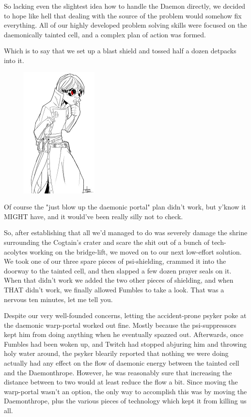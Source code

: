 So lacking even the slightest idea how to handle the Daemon directly, we decided to hope like hell that dealing with the source of the problem would somehow fix everything. 
All of our highly developed problem solving skills were focused on the daemonically tainted cell, and a complex plan of action was formed. 


Which is to say that we set up a blast shield and tossed half a dozen detpacks into it.

\begin{figure}
	\begin{center}
		\includegraphics[width=\figwidth]{pics/15/42.png}
	\end{center}
\end{figure}
Of course the "just blow up the daemonic portal" plan didn't work, but y'know it MIGHT have, and it would've been really silly not to check. 


So, after establishing that all we'd managed to do was severely damage the shrine surrounding the Cogtain's crater and scare the shit out of a bunch of tech-acolytes working on the bridge-lift, we moved on to our next low-effort solution. 
We took one of our three spare pieces of psi-shielding, crammed it into the doorway to the tainted cell, and then slapped a few dozen prayer seals on it. 
When that didn't work we added the two other pieces of shielding, and when THAT didn't work, we finally allowed Fumbles to take a look. 
That was a nervous ten minutes, let me tell you.

Despite our very well-founded concerns, letting the accident-prone psyker poke at the daemonic warp-portal worked out fine. 
Mostly because the psi-suppressors kept him from doing anything when he eventually spazzed out. 
Afterwards, once Fumbles had been woken up, and Twitch had stopped abjuring him and throwing holy water around, the psyker blearily reported that nothing we were doing actually had any effect on the flow of daemonic energy between the tainted cell and the Daemonthrope. 
However, he was reasonably sure that increasing the distance between to two would at least reduce the flow a bit. 
Since moving the warp-portal wasn't an option, the only way to accomplish this was by moving the Daemonthrope, plus the various pieces of technology which kept it from killing us all.

